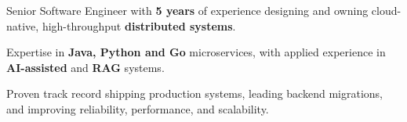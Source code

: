 \begin{zitemize}
    \item Senior Software Engineer with \textbf{5 years} of experience designing and owning cloud-native, high-throughput \textbf{distributed systems}.
    \item Expertise in \textbf{Java, Python and Go} microservices, with applied experience in \textbf{AI-assisted} and \textbf{RAG} systems.
    \item Proven track record shipping production systems, leading backend migrations, and improving reliability, performance, and scalability.
\end{zitemize}
